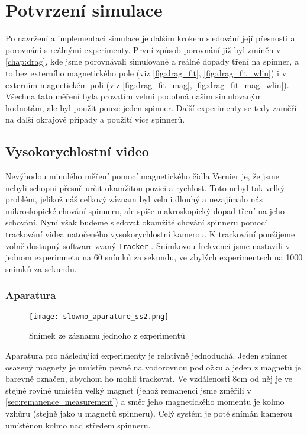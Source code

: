 \chapter{Potvrzení simulace}
\label{chap:sim_confirmation}

Po navržení a implementaci simulace je dalším krokem sledování její přesnosti a porovnání s reálnými experimenty. První způsob porovnání již byl zmíněn v \autoref{chap:drag}, kde jsme porovnávali simulované a reálné dopady tření na spinner, a to bez externího magnetického pole (viz \autoref{fig:drag_fit}, \autoref{fig:drag_fit_wlin}) i v externím magnetickém poli (viz \autoref{fig:drag_fit_mag}, \autoref{fig:drag_fit_mag_wlin}). Všechna tato měření byla prozatím velmi podobná našim simulovaným hodnotám, ale byl použit pouze jeden spinner. Další experimenty se tedy zaměří na další okrajové případy a použití více spinnerů.

\section{Vysokorychlostní video}

Nevýhodou minulého měření pomocí magnetického čidla Vernier je, že jsme nebyli schopni přesně určit okamžitou pozici a rychlost. Toto nebyl tak velký problém, jelikož náš celkový záznam byl velmi dlouhý a nezajímalo nás mikroskopické chování spinneru, ale spíše makroskopický dopad tření na jeho schování. Nyní však budeme sledovat okamžité chování spinneru pomocí trackování videa natočeného vysokorychlostní kamerou. K trackování použijeme volně dostupný software zvaný \texttt{Tracker} \cite{Tracker}. Snímkovou frekvenci jsme nastavili v jednom experimnetu na 60 snímků za sekundu, ve zbylých experimentech na 1000 snímků za sekundu.

\subsection{Aparatura}

\begin{wrapfigure}{r}{0.40\textwidth}
    \texttt{[image: slowmo\_aparature\_ss2.png]}
    \centering
    \caption{Snímek ze záznamu jednoho z experimentů}
    \label{fig:slowmo_aparature_ss2}
\end{wrapfigure}

Aparatura pro následující experimenty je relativně jednoduchá. Jeden spinner osazený magnety je umístěn pevně na vodorovnou podložku a jeden z magnetů je barevně označen, abychom ho mohli trackovat. Ve vzdálenosti 8cm od něj je ve stejné rovině umístěn velký magnet (jehož remanenci jsme změřili v \autoref{sec:remanence_measurement}) a směr jeho magnetického momentu je kolmo vzhůru (stejně jako u magnetů spinneru). Celý systém je poté snímán kamerou umístěnou kolmo nad středem spinneru.

